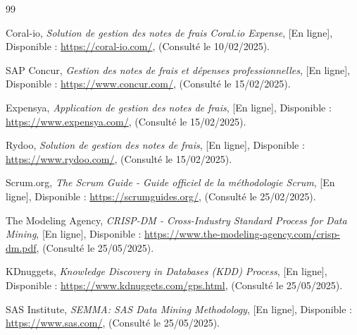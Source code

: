 \documentclass[12pt,a4paper]{report}
\begin{document}
\begin{thebibliography}{99}


 Coral-io, \textit{Solution de gestion des notes de frais Coral.io Expense}, [En ligne], Disponible : \url{https://coral-io.com/}, (Consulté le 10/02/2025).



 SAP Concur, \textit{Gestion des notes de frais et dépenses professionnelles}, [En ligne], Disponible : \url{https://www.concur.com/}, (Consulté le 15/02/2025).

 Expensya, \textit{Application de gestion des notes de frais}, [En ligne], Disponible : \url{https://www.expensya.com/}, (Consulté le 15/02/2025).

 Rydoo, \textit{Solution de gestion des notes de frais}, [En ligne], Disponible : \url{https://www.rydoo.com/}, (Consulté le 15/02/2025).



 Scrum.org, \textit{The Scrum Guide - Guide officiel de la méthodologie Scrum}, [En ligne], Disponible : \url{https://scrumguides.org/}, (Consulté le 25/02/2025).

 The Modeling Agency, \textit{CRISP-DM - Cross-Industry Standard Process for Data Mining}, [En ligne], Disponible : \url{https://www.the-modeling-agency.com/crisp-dm.pdf}, (Consulté le 25/05/2025).

 KDnuggets, \textit{Knowledge Discovery in Databases (KDD) Process}, [En ligne], Disponible : \url{https://www.kdnuggets.com/gps.html}, (Consulté le 25/05/2025).

 SAS Institute, \textit{SEMMA: SAS Data Mining Methodology}, [En ligne], Disponible : \url{https://www.sas.com/}, (Consulté le 25/05/2025).




\end{thebibliography}
\end{document}
